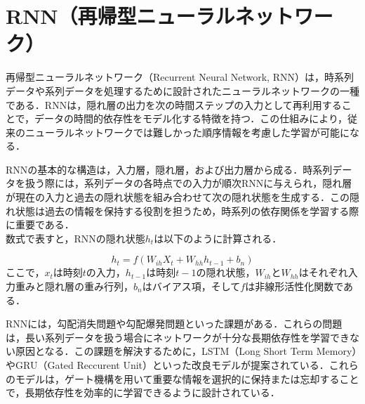 
\section{RNN（再帰型ニューラルネットワーク）}
再帰型ニューラルネットワーク（Recurrent Neural Network, RNN）は，時系列データや系列データを処理するために設計されたニューラルネットワークの一種である．RNNは，隠れ層の出力を次の時間ステップの入力として再利用することで，データの時間的依存性をモデル化する特徴を持つ．この仕組みにより，従来のニューラルネットワークでは難しかった順序情報を考慮した学習が可能になる．

RNNの基本的な構造は，入力層，隠れ層，および出力層から成る．時系列データを扱う際には，系列データの各時点での入力が順次RNNに与えられ，隠れ層が現在の入力と過去の隠れ状態を組み合わせて次の隠れ状態を生成する．この隠れ状態は過去の情報を保持する役割を担うため，時系列の依存関係を学習する際に重要である．\\数式で表すと，RNNの隠れ状態$h_t$は以下のように計算される．

$$
h_t = f(W_{ih}X_t + W_{hh}h_{t-1} + b_n)
$$
ここで，$x_t$は時刻$t$の入力，$h_{t-1}$は時刻$t-1$の隠れ状態，$W_{ih}$と$W_{hh}$はそれぞれ入力重みと隠れ層の重み行列，$b_n$はバイアス項，そして$f$は非線形活性化関数である．

RNNには，勾配消失問題や勾配爆発問題といった課題がある．これらの問題は，長い系列データを扱う場合にネットワークが十分な長期依存性を学習できない原因となる．この課題を解決するために，LSTM（Long Short Term Memory）やGRU（Gated Reccurent Unit）といった改良モデルが提案されている．これらのモデルは，ゲート機構を用いて重要な情報を選択的に保持または忘却することで，長期依存性を効率的に学習できるように設計されている．

\newpage
